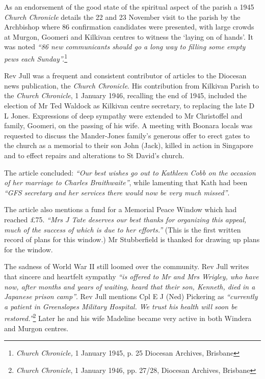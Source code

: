 As an endorsement of the good state of the spiritual aspect of the parish a 1945 \emph{Church Chronicle} details the 22 and 23 November visit to the parish by the Archbishop where 86 confirmation candidates were presented, with large crowds at Murgon, Goomeri and Kilkivan centres to witness the `laying on of hands'. It was noted \emph{``86 new communicants should go a long way to filling some empty pews each Sunday''.}\footnote{\emph{Church Chronicle,} 1 January 1945, p. 25 Diocesan Archives, Brisbane}


Rev Jull was a frequent and consistent contributor of articles to the Diocesan news publication, the \emph{Church Chronicle}. His contribution from Kilkivan Parish to the \emph{Church Chronicle}, 1 January 1946, recalling the end of 1945, included the election of Mr Ted Waldock as Kilkivan centre secretary, to replacing the late D L Jones. Expressions of deep sympathy were extended to Mr Christoffel and family, Goomeri, on the passing of his wife. A meeting with Boonara locals was requested to discuss the Mander-Jones family's generous offer to erect gates to the church as a memorial to their son John (Jack), killed in action in Singapore and to effect repairs and alterations to St David's church.



The article concluded: \emph{``Our best wishes go out to Kathleen Cobb on the occasion of her marriage to Charles Braithwaite''}, while lamenting that Kath had been \emph{``GFS secretary and her services there would now be very much missed''}.



The article also mentions a fund for a Memorial Peace Window which had reached \pounds75. \emph{``Mrs J Tate deserves our best thanks for organizing this appeal, much of the success of which is due to her efforts.''} (This is the first written record of plans for this window.) Mr Stubberfield is thanked for drawing up plans for the window.



The sadness of World War II still loomed over the community. Rev Jull writes that sincere and heartfelt sympathy \emph{``is offered to Mr and Mrs Wrigley, who have now, after months and years of waiting, heard that their son, Kenneth, died in a Japanese prison camp''}. Rev Jull mentions Cpl E J (Ned) Pickering as \emph{``currently a patient in Greenslopes Military Hospital. We trust his health will soon be restored.''}\footnote{\emph{Church Chronicle}, 1 January 1946, pp. 27/28, Diocesan Archives, Brisbane} Later he and his wife Madeline became very active in both Windera and Murgon centres.


